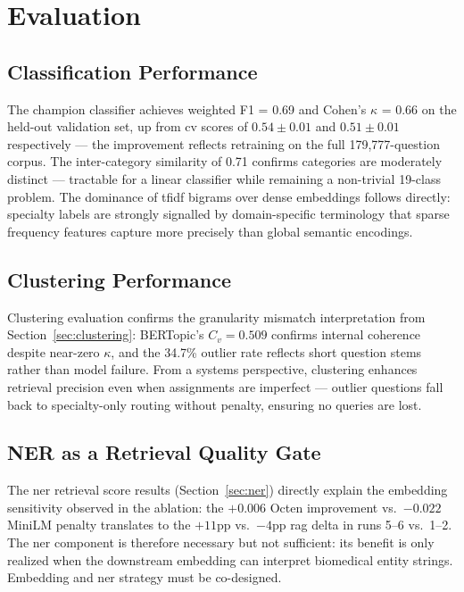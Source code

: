 \section{Evaluation}
\label{sec:evaluation}

\subsection{Classification Performance}

The champion classifier achieves weighted F1 = 0.69 and Cohen's $\kappa$ = 0.66 on the held-out validation set, up from \gls{cv} scores of $0.54 \pm 0.01$ and $0.51 \pm 0.01$ respectively --- the improvement reflects retraining on the full 179,777-question corpus. The inter-category similarity of 0.71 confirms categories are moderately distinct --- tractable for a linear classifier while remaining a non-trivial 19-class problem. The dominance of \gls{tfidf} bigrams over dense embeddings follows directly: specialty labels are strongly signalled by domain-specific terminology that sparse frequency features capture more precisely than global semantic encodings.

\subsection{Clustering Performance}

Clustering evaluation confirms the granularity mismatch interpretation from Section~\ref{sec:clustering}: BERTopic's $C_v = 0.509$ confirms internal coherence despite near-zero $\kappa$, and the 34.7\% outlier rate reflects short question stems rather than model failure. From a systems perspective, clustering enhances retrieval precision even when assignments are imperfect --- outlier questions fall back to specialty-only routing without penalty, ensuring no queries are lost.

\subsection{NER as a Retrieval Quality Gate}

The \gls{ner} retrieval score results (Section~\ref{sec:ner}) directly explain the embedding sensitivity observed in the ablation: the $+0.006$ Octen improvement vs.\ $-0.022$ MiniLM penalty translates to the $+11$\gls{pp} vs.\ $-4$\gls{pp} \gls{rag} delta in runs 5--6 vs.\ 1--2. The \gls{ner} component is therefore necessary but not sufficient: its benefit is only realized when the downstream embedding can interpret biomedical entity strings. Embedding and \gls{ner} strategy must be co-designed.
